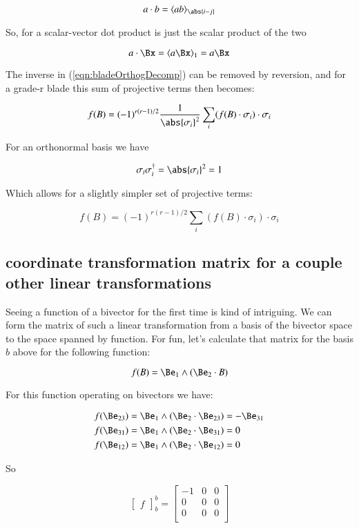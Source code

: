 \documentclass{article}      %
\newcommand{\matrixoftx}[3]{
{
\begin{bmatrix}
{#1}
\end{bmatrix}
}_{#2}^{#3}
}
\begin{document}
\[
a \cdot b = \langle a b \rangle_{\abs{i-j}}
\]

So, for a scalar-vector dot product is just the scalar product of the two

\[
a \cdot \Bx = \langle{ a \Bx }\rangle_1 = a \Bx
\]

The inverse in (\ref{eqn:bladeOrthogDecomp}) can be removed by reversion, and for a grade-r blade this sum of projective terms then becomes:

\begin{equation}
f(B) = (-1)^{r(r-1)/2} \frac{1}{{\abs{\sigma_i}}^2}\sum_i (f(B) \cdot \sigma_i) \cdot {\sigma_i}
\end{equation}

For an orthonormal basis we have

\[
\sigma_i \sigma_i^\dagger = \abs{\sigma_i}^2 = 1
\]

Which allows for a slightly simpler set of projective terms:

\begin{equation}
f(B) = (-1)^{r(r-1)/2} \sum_i (f(B) \cdot \sigma_i) \cdot {\sigma_i}
\end{equation}\label{eqn:OrthonormalDecomp}

\subsection{ coordinate transformation matrix for a couple other linear transformations }

Seeing a function of a bivector for the first time is kind of intriguing.  We can form the matrix of such a linear transformation
from a basis of the bivector space to the space spanned by function.  For fun, let's calculate that matrix for the basis $b$ above
for the following function:

\[
f(B) = \Be_1 \wedge (\Be_2 \cdot B)
\]

For this function operating on  bivectors we have:

\begin{align*}
f(\Be_{23}) &= \Be_1 \wedge (\Be_2 \cdot \Be_{23}) = -\Be_{31} \\
f(\Be_{31}) &= \Be_1 \wedge (\Be_2 \cdot \Be_{31}) = 0 \\
f(\Be_{12}) &= \Be_1 \wedge (\Be_2 \cdot \Be_{12}) = 0 \\
\end{align*}

So

\[
\matrixoftx{f}{b}{b}
= 
\begin{bmatrix}
-1 & 0 & 0 \\
0 & 0 & 0 \\
0 & 0 & 0 \\
\end{bmatrix}
\]
\end{document}
